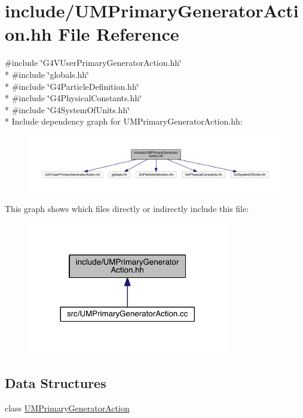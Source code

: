 \hypertarget{UMPrimaryGeneratorAction_8hh}{}\section{include/\+U\+M\+Primary\+Generator\+Action.hh File Reference}
\label{UMPrimaryGeneratorAction_8hh}
{\ttfamily \#include \char`\"{}G4\+V\+User\+Primary\+Generator\+Action.\+hh\char`\"{}}\\*
{\ttfamily \#include \char`\"{}globals.\+hh\char`\"{}}\\*
{\ttfamily \#include \char`\"{}G4\+Particle\+Definition.\+hh\char`\"{}}\\*
{\ttfamily \#include \char`\"{}G4\+Physical\+Constants.\+hh\char`\"{}}\\*
{\ttfamily \#include \char`\"{}G4\+System\+Of\+Units.\+hh\char`\"{}}\\*
Include dependency graph for U\+M\+Primary\+Generator\+Action.\+hh\+:
\nopagebreak
\begin{figure}[H]
\begin{center}
\leavevmode
\includegraphics[width=350pt]{UMPrimaryGeneratorAction_8hh__incl}
\end{center}
\end{figure}
This graph shows which files directly or indirectly include this file\+:
\nopagebreak
\begin{figure}[H]
\begin{center}
\leavevmode
\includegraphics[width=248pt]{UMPrimaryGeneratorAction_8hh__dep__incl}
\end{center}
\end{figure}
\subsection*{Data Structures}
\begin{DoxyCompactItemize}
\item 
class \hyperlink{classUMPrimaryGeneratorAction}{U\+M\+Primary\+Generator\+Action}
\end{DoxyCompactItemize}
